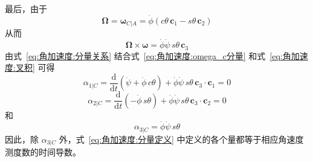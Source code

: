 \begin{example}
    最后，由于
    \begin{equation}
        \bm{\Omega} = \bm{\omega}_{C|A} = \dot{\phi}(c\theta\,\mathbf{c}_1-s\theta\,\mathbf{c}_2)
        \label{eq:角加速度:omegaC_A}
    \end{equation}
    从而
    \begin{equation}
        \bm{\Omega}\times\bm{\omega} = \dot{\phi}\dot{\psi}\,s\theta\,\mathbf{c}_3
        \label{eq:角加速度:叉积}
    \end{equation}
    由式~\eqref{eq:角加速度:分量关系} 结合式~\eqref{eq:角加速度:omega_c分量} 和式~\eqref{eq:角加速度:叉积} 可得
    \begin{equation}
        \alpha_{1|C} = \frac{\mathrm{d}}{\mathrm{d}t}(\dot{\psi}+\dot{\phi}\,c\theta) + \dot{\phi}\dot{\psi}\,s\theta\,\mathbf{c}_3\cdot\mathbf{c}_1 = 0
    \end{equation}
    \begin{equation}
        \alpha_{2|C} = \frac{\mathrm{d}}{\mathrm{d}t}(-\dot{\phi}\,s\theta) + \dot{\phi}\dot{\psi}\,s\theta\,\mathbf{c}_3\cdot\mathbf{c}_2 = 0
    \end{equation}
    和
    \begin{equation}
        \alpha_{3|C} = \dot{\phi}\dot{\psi}\,s\theta
    \end{equation}
    因此，除 $\alpha_{3|C}$ 外，式~\eqref{eq:角加速度:分量定义} 中定义的各个量都等于相应角速度测度数的时间导数。
\end{example}

